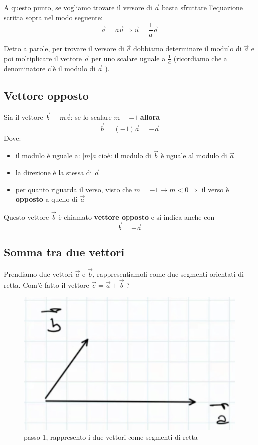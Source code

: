 A questo punto, se vogliamo trovare il versore di $\overrightarrow{a}$ basta sfruttare l'equazione scritta sopra nel modo seguente:
$$ \overrightarrow{a} = a \overrightarrow{u} \Rightarrow \overrightarrow{u} = \frac{1}{a} \overrightarrow{a} $$

Detto a parole, per trovare il versore di $ \overrightarrow{a} $ dobbiamo determinare il modulo di $ \overrightarrow{a} $ e poi moltiplicare il vettore $ \overrightarrow{a} $ per uno scalare uguale a $ \frac{1}{a} $ (ricordiamo che a denominatore c'è il modulo di $ \overrightarrow{a} $ ).

\subsection{Vettore opposto}
Sia il vettore $\overrightarrow{b} = m\overrightarrow{a} $: se lo scalare $ m = - 1 $ \textbf{allora}
$$ \overrightarrow{b} = (-1) \overrightarrow{a} = -  \overrightarrow{a} $$
Dove:
\begin{itemize}
	\item il modulo è uguale a: $\left | m \right | a $ cioè: il modulo di $ \overrightarrow{b} $ è uguale al modulo di $ \overrightarrow{a} $
	\item la direzione è la stessa di $ \overrightarrow{a}$
	\item per quanto riguarda il verso, visto che $ m = -1 \rightarrow m < 0 \Rightarrow$ il verso è \textbf{opposto} a quello di $ \overrightarrow{a} $
\end{itemize}

Questo vettore $\overrightarrow{b}$ è chiamato \textbf{vettore opposto} e si indica anche con
$$ \overrightarrow{b} = - \overrightarrow{a} $$
\newpage
\subsection{Somma tra due vettori}
Prendiamo due vettori $\overrightarrow{a}$ e $ \overrightarrow{b} $, rappresentiamoli come due segmenti orientati di retta. Com'è fatto il vettore $\overrightarrow{c} = \overrightarrow{a} + \overrightarrow{b} $ ?
\begin{figure}[h]
\begin{center}
\includegraphics[width = 0.5 \textwidth]{lezione1/images/somma1.png}
\caption{passo 1, rappresento i due vettori come segmenti di retta}
\label{fig:somma1}
\end{center}
\end{figure}

